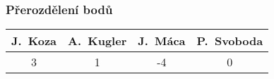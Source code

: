 \documentclass{beamer}
\begin{document}


\begin{frame}[allowframebreaks]\frametitle{Přerozdělení bodů}
    
    \begin{center}
  \begin{tabular}{| c | c | c | c |}
    \hline
     J.~Koza & A.~Kugler & J.~Máca & P.~Svoboda \\
    \hline
     3 & 1 & -4 & 0 \\
    \hline
  \end{tabular}     
   \end{center}
\end{frame}
\end{document}
